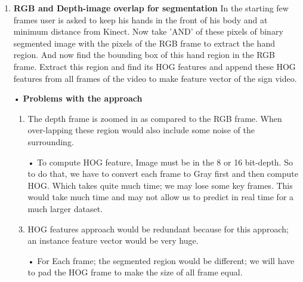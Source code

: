 \begin{enumerate}
	\item \textbf{ RGB and Depth-image overlap for segmentation }
In the starting few frames user is asked to keep his hands in the front of his body and at minimum distance from Kinect. Now take 'AND' of these pixels of binary segmented image with the pixels of the RGB frame to extract the hand region. And now find the bounding box of this hand region in the RGB frame. Extract this region and find its HOG features and append these HOG features from all frames of the video to make feature vector of the sign video.

\item[•] \textbf{Problems with the approach}
\begin{enumerate}
\item The depth frame is zoomed in as compared to the RGB frame. When over-lapping these region would also include some noise of the surrounding.
\item[•]To compute HOG feature, Image must be in the 8 or 16 bit-depth. So to do that, we have to convert each frame to Gray first and then compute HOG. Which takes quite much time; we may lose some key frames. This would take much time and may not allow us to predict in real time for a much larger dataset.
\item HOG features approach would be redundant because for this approach; an instance feature vector would be very huge.
\item[•]For Each frame; the segmented region would be different; we will have to pad the HOG frame to make the size of all frame equal.
\end{enumerate}



\end{enumerate}
